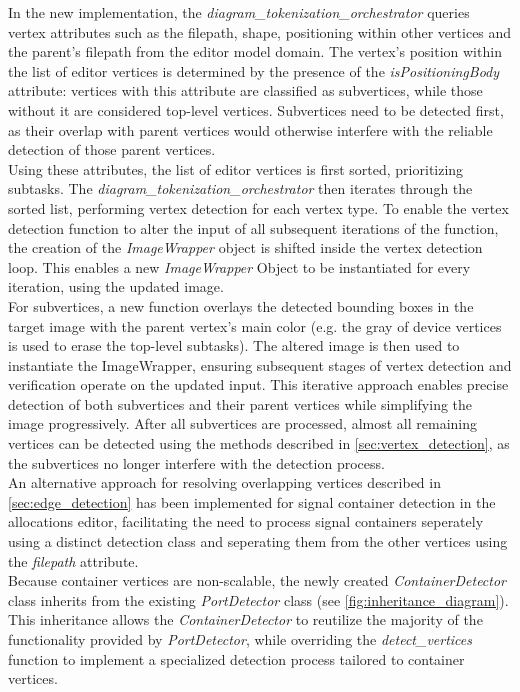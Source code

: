 In the new implementation, the \textit{diagram\_tokenization\_orchestrator} queries vertex attributes such as the filepath, shape, positioning within other vertices and the parent's filepath from the editor model domain. The vertex's position within the list of editor vertices is determined by the presence of the \textit{isPositioningBody} attribute: vertices with this attribute are classified as subvertices, while those without it are considered top-level vertices. Subvertices need to be detected first, as their overlap with parent vertices would otherwise interfere with the reliable detection of those parent vertices.\\
Using these attributes, the list of editor vertices is first sorted, prioritizing subtasks. The \textit{diagram\_tokenization\_orchestrator} then iterates through the sorted list, performing vertex detection for each vertex type. 
To enable the vertex detection function to alter the input of all subsequent iterations of the function, the creation of the \textit{ImageWrapper} object is shifted inside the vertex detection loop. This enables a new \textit{ImageWrapper} Object to be instantiated for every iteration, using the updated image.\\
For subvertices, a new function overlays the detected bounding boxes in the target image with the parent vertex's main color (e.g. the gray of device vertices is used to erase the top-level subtasks). The altered image is then used to instantiate the ImageWrapper, ensuring subsequent stages of vertex detection and verification operate on the updated input. This iterative approach enables precise detection of both subvertices and their parent vertices while simplifying the image progressively.
After all subvertices are processed, almost all remaining vertices can be detected using the methods described in \autoref{sec:vertex_detection}, as the subvertices no longer interfere with the detection process.\\
An alternative approach for resolving overlapping vertices described in \autoref{sec:edge_detection} has been implemented for signal container detection in the allocations editor, facilitating the need to process signal containers seperately using a distinct detection class and seperating them from the other vertices using the \textit{filepath} attribute.\\
Because container vertices are non-scalable, the newly created \textit{ContainerDetector} class inherits from the existing \textit{PortDetector} class (see \autoref{fig:inheritance_diagram}). This inheritance allows the \textit{ContainerDetector} to reutilize the majority of the functionality provided by \textit{PortDetector}, while overriding the \textit{detect\_vertices} function to implement a specialized detection process tailored to container vertices.
